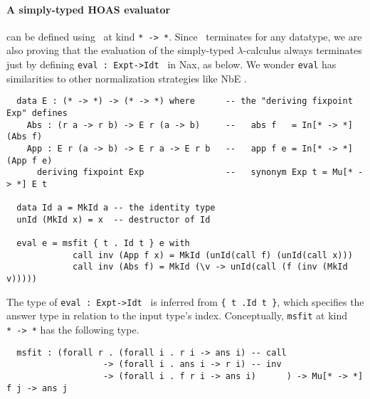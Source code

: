 \paragraph{A simply-typed HOAS evaluator\!\!\!} can be defined
using \MsfIt\ at kind \texttt{*\,->\,*}.  Since \MsfIt\ terminates
for any datatype, we are also proving that the evaluation of
the simply-typed $\lambda$-calculus always terminates
just by defining \texttt{eval\,:\,Exp\;t\;->\;Id\;t\,} in Nax, as below.
We wonder \texttt{eval} has similarities to other normalization strategies
like NbE \cite{BerSch91}.
\vspace*{-1ex}
{\small
\begin{verbatim}
  data E : (* -> *) -> (* -> *) where      -- the "deriving fixpoint Exp" defines
    Abs : (r a -> r b) -> E r (a -> b)     --   abs f   = In[* -> *] (Abs f)
    App : E r (a -> b) -> E r a -> E r b   --   app f e = In[* -> *] (App f e)
      deriving fixpoint Exp                --   synonym Exp t = Mu[* -> *] E t

  data Id a = MkId a -- the identity type
  unId (MkId x) = x  -- destructor of Id
  
  eval e = msfit { t . Id t } e with
             call inv (App f x) = MkId (unId(call f) (unId(call x)))
             call inv (Abs f) = MkId (\v -> unId(call (f (inv (MkId v)))))
\end{verbatim} }
\vspace*{-.5ex}\noindent
The type of \texttt{eval\,:\,Exp\;t\;->\;Id\;t\,} is inferred from
\texttt{\{\,t\,.\;Id t\,\}}, which specifies the answer type in relation
to the input type's index.
Conceptually, \texttt{msfit} at kind \texttt{*\,->\,*} has the following type.\vspace*{-.5ex}
{\small
\begin{verbatim}
  msfit : (forall r . (forall i . r i -> ans i) -- call
                   -> (forall i . ans i -> r i) -- inv
                   -> (forall i . f r i -> ans i)      ) -> Mu[* -> *] f j -> ans j
\end{verbatim} }
\vspace*{-2.5ex}
